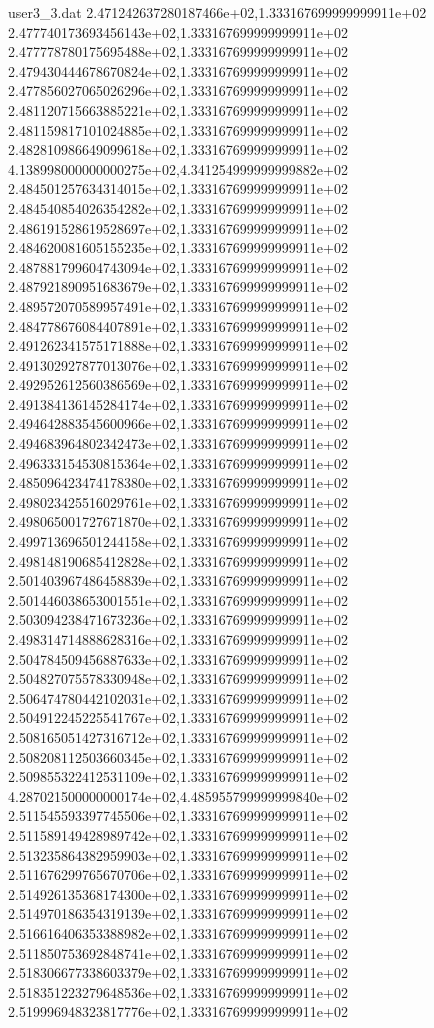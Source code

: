 \begin{filecontents}{user3_3.dat}
2.471242637280187466e+02,1.333167699999999911e+02
2.477740173693456143e+02,1.333167699999999911e+02
2.477778780175695488e+02,1.333167699999999911e+02
2.479430444678670824e+02,1.333167699999999911e+02
2.477856027065026296e+02,1.333167699999999911e+02
2.481120715663885221e+02,1.333167699999999911e+02
2.481159817101024885e+02,1.333167699999999911e+02
2.482810986649099618e+02,1.333167699999999911e+02
4.138998000000000275e+02,4.341254999999999882e+02
2.484501257634314015e+02,1.333167699999999911e+02
2.484540854026354282e+02,1.333167699999999911e+02
2.486191528619528697e+02,1.333167699999999911e+02
2.484620081605155235e+02,1.333167699999999911e+02
2.487881799604743094e+02,1.333167699999999911e+02
2.487921890951683679e+02,1.333167699999999911e+02
2.489572070589957491e+02,1.333167699999999911e+02
2.484778676084407891e+02,1.333167699999999911e+02
2.491262341575171888e+02,1.333167699999999911e+02
2.491302927877013076e+02,1.333167699999999911e+02
2.492952612560386569e+02,1.333167699999999911e+02
2.491384136145284174e+02,1.333167699999999911e+02
2.494642883545600966e+02,1.333167699999999911e+02
2.494683964802342473e+02,1.333167699999999911e+02
2.496333154530815364e+02,1.333167699999999911e+02
2.485096423474178380e+02,1.333167699999999911e+02
2.498023425516029761e+02,1.333167699999999911e+02
2.498065001727671870e+02,1.333167699999999911e+02
2.499713696501244158e+02,1.333167699999999911e+02
2.498148190685412828e+02,1.333167699999999911e+02
2.501403967486458839e+02,1.333167699999999911e+02
2.501446038653001551e+02,1.333167699999999911e+02
2.503094238471673236e+02,1.333167699999999911e+02
2.498314714888628316e+02,1.333167699999999911e+02
2.504784509456887633e+02,1.333167699999999911e+02
2.504827075578330948e+02,1.333167699999999911e+02
2.506474780442102031e+02,1.333167699999999911e+02
2.504912245225541767e+02,1.333167699999999911e+02
2.508165051427316712e+02,1.333167699999999911e+02
2.508208112503660345e+02,1.333167699999999911e+02
2.509855322412531109e+02,1.333167699999999911e+02
4.287021500000000174e+02,4.485955799999999840e+02
2.511545593397745506e+02,1.333167699999999911e+02
2.511589149428989742e+02,1.333167699999999911e+02
2.513235864382959903e+02,1.333167699999999911e+02
2.511676299765670706e+02,1.333167699999999911e+02
2.514926135368174300e+02,1.333167699999999911e+02
2.514970186354319139e+02,1.333167699999999911e+02
2.516616406353388982e+02,1.333167699999999911e+02
2.511850753692848741e+02,1.333167699999999911e+02
2.518306677338603379e+02,1.333167699999999911e+02
2.518351223279648536e+02,1.333167699999999911e+02
2.519996948323817776e+02,1.333167699999999911e+02

\end{filecontents}
